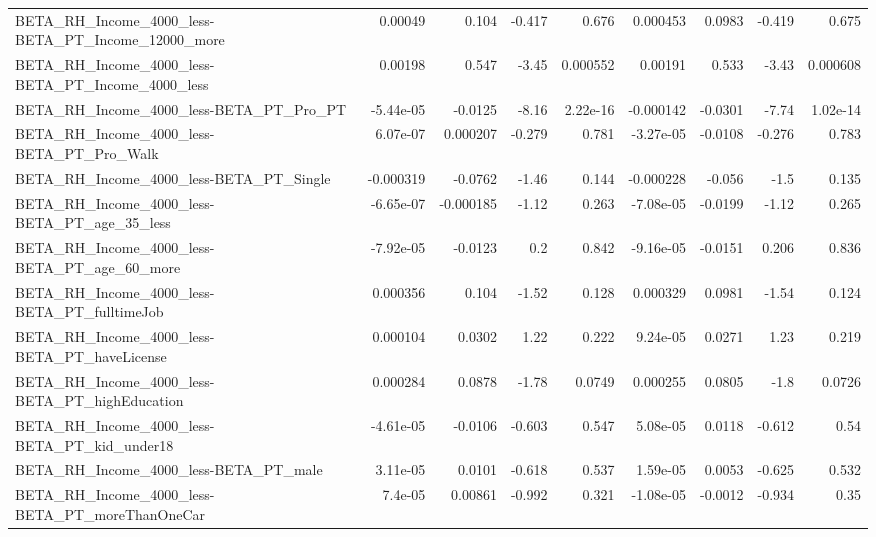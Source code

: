 \begin{tabular}{lrrrrrrrr}
BETA\_RH\_Income\_4000\_less-BETA\_PT\_Income\_12000\_more &     0.00049 &        0.104 &    -0.417 &    0.676 &   0.000453 &      0.0983 &       -0.419 &         0.675 \\
BETA\_RH\_Income\_4000\_less-BETA\_PT\_Income\_4000\_less  &     0.00198 &        0.547 &     -3.45 & 0.000552 &    0.00191 &       0.533 &        -3.43 &      0.000608 \\
BETA\_RH\_Income\_4000\_less-BETA\_PT\_Pro\_PT            &   -5.44e-05 &      -0.0125 &     -8.16 & 2.22e-16 &  -0.000142 &     -0.0301 &        -7.74 &      1.02e-14 \\
BETA\_RH\_Income\_4000\_less-BETA\_PT\_Pro\_Walk          &    6.07e-07 &     0.000207 &    -0.279 &    0.781 &  -3.27e-05 &     -0.0108 &       -0.276 &         0.783 \\
BETA\_RH\_Income\_4000\_less-BETA\_PT\_Single            &   -0.000319 &      -0.0762 &     -1.46 &    0.144 &  -0.000228 &      -0.056 &         -1.5 &         0.135 \\
BETA\_RH\_Income\_4000\_less-BETA\_PT\_age\_35\_less       &   -6.65e-07 &    -0.000185 &     -1.12 &    0.263 &  -7.08e-05 &     -0.0199 &        -1.12 &         0.265 \\
BETA\_RH\_Income\_4000\_less-BETA\_PT\_age\_60\_more       &   -7.92e-05 &      -0.0123 &       0.2 &    0.842 &  -9.16e-05 &     -0.0151 &        0.206 &         0.836 \\
BETA\_RH\_Income\_4000\_less-BETA\_PT\_fulltimeJob       &    0.000356 &        0.104 &     -1.52 &    0.128 &   0.000329 &      0.0981 &        -1.54 &         0.124 \\
BETA\_RH\_Income\_4000\_less-BETA\_PT\_haveLicense       &    0.000104 &       0.0302 &      1.22 &    0.222 &   9.24e-05 &      0.0271 &         1.23 &         0.219 \\
BETA\_RH\_Income\_4000\_less-BETA\_PT\_highEducation     &    0.000284 &       0.0878 &     -1.78 &   0.0749 &   0.000255 &      0.0805 &         -1.8 &        0.0726 \\
BETA\_RH\_Income\_4000\_less-BETA\_PT\_kid\_under18       &   -4.61e-05 &      -0.0106 &    -0.603 &    0.547 &   5.08e-05 &      0.0118 &       -0.612 &          0.54 \\
BETA\_RH\_Income\_4000\_less-BETA\_PT\_male              &    3.11e-05 &       0.0101 &    -0.618 &    0.537 &   1.59e-05 &      0.0053 &       -0.625 &         0.532 \\
BETA\_RH\_Income\_4000\_less-BETA\_PT\_moreThanOneCar    &     7.4e-05 &      0.00861 &    -0.992 &    0.321 &  -1.08e-05 &     -0.0012 &       -0.934 &          0.35 \\

\end{tabular}
